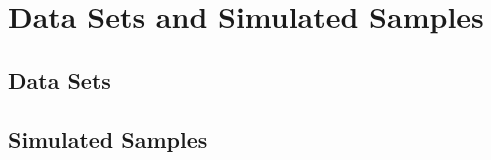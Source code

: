 \section{Data Sets and Simulated Samples}
\label{sec:datasets}

\subsection{Data Sets}

\subsection{Simulated Samples}
\label{subsec:sim_samples}